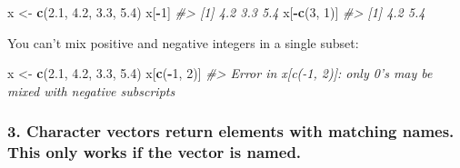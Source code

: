 \documentclass[]{book}
\newenvironment{Shaded}{\begin{snugshade}}{\end{snugshade}}
\newcommand{\KeywordTok}[1]{\textcolor[rgb]{0.13,0.29,0.53}{\textbf{#1}}}
\newcommand{\DecValTok}[1]{\textcolor[rgb]{0.00,0.00,0.81}{#1}}
\newcommand{\FloatTok}[1]{\textcolor[rgb]{0.00,0.00,0.81}{#1}}
\newcommand{\StringTok}[1]{\textcolor[rgb]{0.31,0.60,0.02}{#1}}
\newcommand{\CommentTok}[1]{\textcolor[rgb]{0.56,0.35,0.01}{\textit{#1}}}
\newcommand{\OperatorTok}[1]{\textcolor[rgb]{0.81,0.36,0.00}{\textbf{#1}}}
\newcommand{\NormalTok}[1]{#1}
\begin{document}
\begin{Shaded}
\begin{Highlighting}[]
\NormalTok{x <-}\StringTok{ }\KeywordTok{c}\NormalTok{(}\FloatTok{2.1}\NormalTok{, }\FloatTok{4.2}\NormalTok{, }\FloatTok{3.3}\NormalTok{, }\FloatTok{5.4}\NormalTok{)}
\NormalTok{x[}\OperatorTok{-}\DecValTok{1}\NormalTok{]}
\CommentTok{#> [1] 4.2 3.3 5.4}
\NormalTok{x[}\OperatorTok{-}\KeywordTok{c}\NormalTok{(}\DecValTok{3}\NormalTok{, }\DecValTok{1}\NormalTok{)]}
\CommentTok{#> [1] 4.2 5.4}
\end{Highlighting}
\end{Shaded}

You can't mix positive and negative integers in a single subset:

\begin{Shaded}
\begin{Highlighting}[]
\NormalTok{x <-}\StringTok{ }\KeywordTok{c}\NormalTok{(}\FloatTok{2.1}\NormalTok{, }\FloatTok{4.2}\NormalTok{, }\FloatTok{3.3}\NormalTok{, }\FloatTok{5.4}\NormalTok{)}
\NormalTok{x[}\KeywordTok{c}\NormalTok{(}\OperatorTok{-}\DecValTok{1}\NormalTok{, }\DecValTok{2}\NormalTok{)]}
\CommentTok{#> Error in x[c(-1, 2)]: only 0's may be mixed with negative subscripts}
\end{Highlighting}
\end{Shaded}

\subsubsection*{\texorpdfstring{3. \textbf{Character vectors} return
elements with matching names. This only works if the vector is
named.}{3. Character vectors return elements with matching names. This only works if the vector is named.}}\label{character-vectors-return-elements-with-matching-names.-this-only-works-if-the-vector-is-named.}
\end{document}
